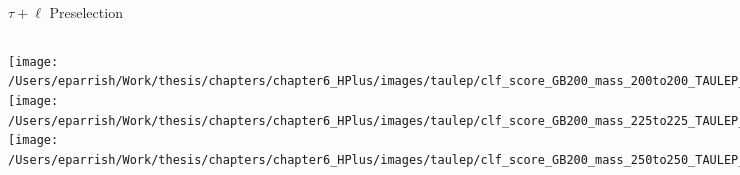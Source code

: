 \documentclass[aspectratio=169,xcolor=table]{beamer}
\begin{document}
    \begin{frame}[t]{$\tau+\ell$ Preselection}
      \begin{columns}[t]
          \texttt{[image: /Users/eparrish/Work/thesis/chapters/chapter6\_HPlus/images/taulep/clf\_score\_GB200\_mass\_200to200\_TAULEP\_PRESEL.png]}
          \texttt{[image: /Users/eparrish/Work/thesis/chapters/chapter6\_HPlus/images/taulep/clf\_score\_GB200\_mass\_225to225\_TAULEP\_PRESEL.png]}
          \texttt{[image: /Users/eparrish/Work/thesis/chapters/chapter6\_HPlus/images/taulep/clf\_score\_GB200\_mass\_250to250\_TAULEP\_PRESEL.png]}

          \texttt{[image: /Users/eparrish/Work/thesis/chapters/chapter6\_HPlus/images/taulep/clf\_score\_GB200\_mass\_275to275\_TAULEP\_PRESEL.png]}
          \texttt{[image: /Users/eparrish/Work/thesis/chapters/chapter6\_HPlus/images/taulep/clf\_score\_GB200\_mass\_300to300\_TAULEP\_PRESEL.png]}
          \texttt{[image: /Users/eparrish/Work/thesis/chapters/chapter6\_HPlus/images/taulep/clf\_score\_GB200\_mass\_350to350\_TAULEP\_PRESEL.png]}

          \texttt{[image: /Users/eparrish/Work/thesis/chapters/chapter6\_HPlus/images/taulep/clf\_score\_GB200\_mass\_400to400\_TAULEP\_PRESEL.png]}
          \texttt{[image: /Users/eparrish/Work/thesis/chapters/chapter6\_HPlus/images/taulep/clf\_score\_GB200\_mass\_500to500\_TAULEP\_PRESEL.png]}
          \texttt{[image: /Users/eparrish/Work/thesis/chapters/chapter6\_HPlus/images/taulep/clf\_score\_GB200\_mass\_600to600\_TAULEP\_PRESEL.png]}

          \texttt{[image: /Users/eparrish/Work/thesis/chapters/chapter6\_HPlus/images/taulep/clf\_score\_GB200\_mass\_700to700\_TAULEP\_PRESEL.png]}
          \texttt{[image: /Users/eparrish/Work/thesis/chapters/chapter6\_HPlus/images/taulep/clf\_score\_GB200\_mass\_800to800\_TAULEP\_PRESEL.png]}
          \texttt{[image: /Users/eparrish/Work/thesis/chapters/chapter6\_HPlus/images/taulep/clf\_score\_GB200\_mass\_900to900\_TAULEP\_PRESEL.png]}

      \end{columns}
    \end{frame}
\end{document}
